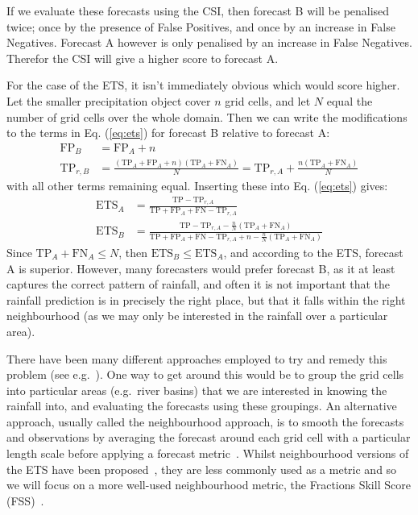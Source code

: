 \documentclass[../main.tex]{subfiles}
\begin{document}
If we evaluate these forecasts using the CSI, then forecast B will be penalised twice; once by the presence of False Positives, and once by an increase in False Negatives. Forecast A however is only penalised by an increase in False Negatives. Therefor the CSI will give a higher score to forecast A. 

For the case of the ETS, it isn't immediately obvious which would score higher. Let the smaller precipitation object cover $n$ grid cells, and let $N$ equal the number of grid cells over the whole domain. Then we can write the modifications to the terms in Eq. (\ref{eq:ets}) for forecast B relative to forecast A: 
\begin{align}
    \text{FP}_B &= \text{FP}_A + n \\
    \text{TP}_{r,B} &= \frac{(\text{TP}_A + \text{FP}_A + n)(\text{TP}_A + \text{FN}_A)}{N} = \text{TP}_{r,A} + \frac{n(\text{TP}_A + \text{FN}_A)}{N}
\end{align}
with all other terms remaining equal. Inserting these into Eq. (\ref{eq:ets}) gives:
\begin{align}
\text{ETS}_A &= \frac{\text{TP} -  \text{TP}_{r,A}}{\text{TP} + \text{FP}_A + \text{FN} - \text{TP}_{r,A}} \\
\text{ETS}_B &= \frac{\text{TP} -  \text{TP}_{r,A} - \frac{n}{N}(\text{TP}_A + \text{FN}_A)}{\text{TP} + \text{FP}_A + \text{FN} - \text{TP}_{r,A} + n - \frac{n}{N}(\text{TP}_A + \text{FN}_A)}
\end{align}
Since $\text{TP}_A + \text{FN}_A \leq N$, then $\text{ETS}_B \leq \text{ETS}_A$, and according to the ETS, forecast A is superior. However, many forecasters would prefer forecast B, as it at least captures the correct pattern of rainfall, and often it is not important that the rainfall prediction is in precisely the right place, but that it falls within the right neighbourhood (as we may only be interested in the rainfall over a particular area). 

There have been many different approaches employed to try and remedy this problem (see e.g.~\cite{gilleland_intercomparison_2009}). One way to get around this would be to group the grid cells into particular areas (e.g.~river basins) that we are interested in knowing the rainfall into, and evaluating the forecasts using these groupings. An alternative approach, usually called the neighbourhood approach, is to smooth the forecasts and observations by averaging the forecast around each grid cell with a particular length scale before applying a forecast metric~\citep{ebert_fuzzy_2008, schwartz_comparison_2017, stein_neighborhood-based_2019}. Whilst neighbourhood versions of the ETS have been proposed~\citep{schwartz_comparison_2017}, they are less commonly used as a metric and so we will focus on a more well-used neighbourhood metric, the Fractions Skill Score (FSS)~\citep{roberts_assessing_2008, roberts_scale-selective_2008}.
\end{document}

